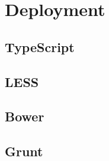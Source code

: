 \section{Deployment}

\subsection{TypeScript}

\subsection{LESS}

\subsection{Bower}

\subsection{Grunt}

